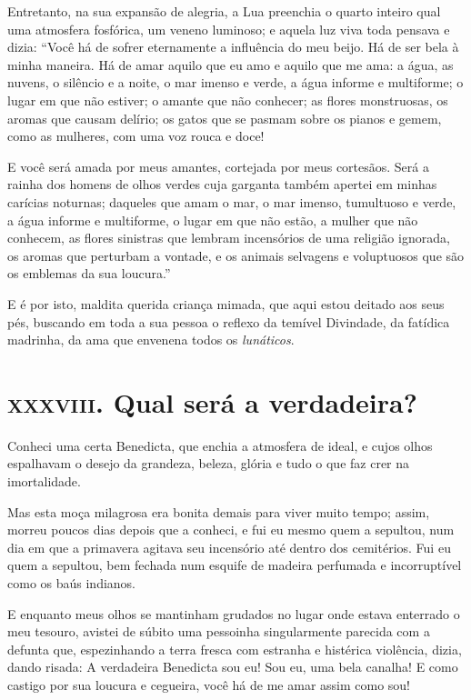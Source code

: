 Entretanto, na sua expansão de alegria, a Lua preenchia o quarto inteiro 
qual uma atmosfera fosfórica, um veneno luminoso; e aquela 
luz viva toda pensava e dizia: “Você há de sofrer eternamente
a influência do meu beijo. Há de ser bela à minha maneira. Há de amar
aquilo que eu amo e aquilo que me ama: a água, as nuvens, o silêncio e
a noite, o mar imenso e verde, a água informe e multiforme; o lugar em
que não estiver; o amante que não conhecer; as flores monstruosas, os
aromas que causam delírio; os gatos que se pasmam sobre os pianos e
gemem, como as mulheres, com uma voz rouca e doce!

E você será amada por meus amantes, cortejada por meus
cortesãos. Será a rainha dos homens de olhos verdes cuja
garganta também apertei em minhas carícias noturnas; daqueles que amam
o mar, o mar imenso, tumultuoso e verde, a água informe e multiforme, o
lugar em que não estão, a mulher que não conhecem, as flores sinistras
que lembram incensórios de uma religião ignorada, os
aromas que perturbam a vontade, e os animais selvagens e voluptuosos
que são os emblemas da sua loucura.''

E é por isto, maldita querida criança mimada, que aqui estou deitado
aos seus pés, buscando em toda a sua pessoa o reflexo da temível
Divindade, da fatídica madrinha, da ama que envenena todos os
\textit{lunáticos}.

\chapter{\textsc{xxxviii.} Qual será a verdadeira?}

Conheci uma certa Benedicta, que enchia a atmosfera de ideal, e cujos
olhos espalhavam o desejo da grandeza, beleza, glória e tudo o
que faz crer na imortalidade.

Mas esta moça milagrosa era bonita demais para viver muito tempo;
assim, morreu poucos dias depois que a conheci, e fui eu
mesmo quem a sepultou, num dia em que a primavera agitava seu
incensório até dentro dos cemitérios. Fui eu quem a sepultou, bem
fechada num esquife de madeira perfumada e incorruptível como os baús
indianos.

E enquanto meus olhos se mantinham grudados no lugar onde estava enterrado
o meu tesouro, avistei de súbito uma pessoinha singularmente parecida com a defunta que, espezinhando a terra fresca com 
estranha e histérica violência, dizia, dando risada:
A verdadeira Benedicta sou eu! Sou eu, uma bela
canalha! E como castigo por sua loucura e cegueira, você há de me amar assim
como sou!

